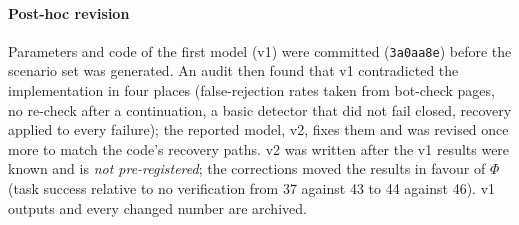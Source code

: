 \paragraph{Post-hoc revision} Parameters and code of the first model (v1) were committed (\texttt{3a0aa8e}) before the scenario set was generated. An audit then found that v1 contradicted the implementation in four places (false-rejection rates taken from bot-check pages, no re-check after a continuation, a basic detector that did not fail closed, recovery applied to every failure); the reported model, v2, fixes them and was revised once more to match the code's recovery paths. v2 was written after the v1 results were known and is \emph{not pre-registered}; the corrections moved the results in favour of $\Phi$ (task success relative to no verification from 37 against 43 to 44 against 46). v1 outputs and every changed number are archived.

